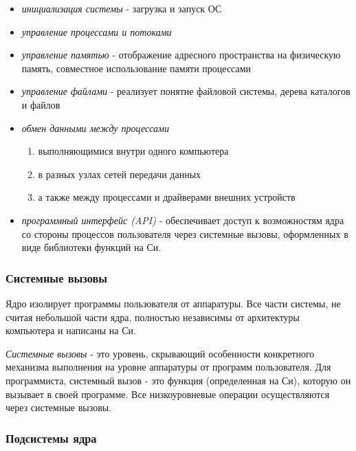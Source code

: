 \begin{itemize}
\item  \emph{инициализация системы} - загрузка и запуск ОС
\item  \emph{управление процессами и потоками} 
\item  \emph{управление памятью} - отображение адресного пространства на физическую память, совместное использование памяти процессами
\item  \emph{управление файлами} - реализует понятие файловой системы, дерева каталогов и файлов 
\item  \emph{обмен данными между процессами} 
	\begin{enumerate}
	\item  выполняющимися внутри одного компьютера
 	\item  в разных узлах сетей передачи данных
 	\item  а также между процессами и драйверами внешних устройств
	\end{enumerate}
\item  \emph{программный интерфейс (API)} - обеспечивает доступ к возможностям ядра со стороны процессов пользователя через системные вызовы, оформленных в виде библиотеки функций на Си.
\end{itemize}

\subsubsection{Системные вызовы}

Ядро изолирует программы пользователя от аппаратуры. Все части системы, не считая небольшой части ядра, полностью независимы от архитектуры компьютера и написаны на Си.

\emph{Системные вызовы} - это уровень, скрывающий особенности конкретного механизма выполнения на уровне аппаратуры от программ пользователя. Для программиста, системный вызов - это функция (определенная на Си), которую он вызывает в своей программе. Все низкоуровневые операции осуществляются через системные вызовы.

\subsubsection{Подсистемы ядра}

